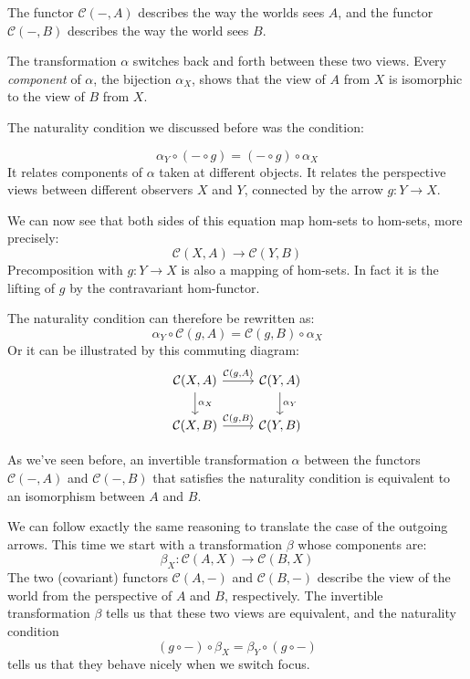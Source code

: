 \documentclass[DaoFP]{subfiles}
\begin{document}
The functor $\mathcal{C}(-, A)$ describes the way the worlds sees $A$, and the functor $\mathcal{C}(-, B)$ describes the way the world sees $B$. 

The transformation $\alpha$ switches back and forth between these two views. Every \emph{component} of $\alpha$, the bijection $\alpha_X$, shows that the view of $A$ from $X$ is isomorphic to the view of $B$ from $X$. 

The naturality condition we discussed before was the condition:

\[ \alpha_Y \circ (- \circ g) = (- \circ g) \circ \alpha_X \]
It relates components of $\alpha$ taken at different objects. It relates the perspective views between different observers $X$ and $Y$, connected by the arrow $g \colon Y \to X$. 

We can now see that both sides of this equation map hom-sets to hom-sets, more precisely:
\[\mathcal{C}(X, A) \to \mathcal{C}(Y, B)\]
Precomposition with $g \colon Y \to X$ is also a mapping of hom-sets. In fact it is the lifting of $g$ by the contravariant hom-functor. 

The naturality condition can therefore be rewritten as:
\[ \alpha_Y \circ \mathcal{C}(g, A) = \mathcal{C}(g, B) \circ \alpha_X \]
Or it can be illustrated by this commuting diagram:
\[
 \begin{tikzcd}
 \mathcal{C}(X, A)
 \arrow[d, "\alpha_X"]
 \arrow[r, "{\mathcal{C}(g, A)}"]
 &
 \mathcal{C}(Y, A)
  \arrow[d, "\alpha_Y"]
 \\
 \mathcal{C}(X, B)
 \arrow[r, "{\mathcal{C}(g, B)}"]
& \mathcal{C}(Y, B)
 \end{tikzcd}
\]

As we've seen before, an invertible transformation $\alpha$ between the functors $\mathcal{C}(-, A)$ and $\mathcal{C}(-, B)$ that satisfies the naturality condition is equivalent to an isomorphism between $A$ and $B$.

We can follow exactly the same reasoning to translate the case of the outgoing arrows. This time we start with a transformation $\beta$ whose components are:
\[ \beta_X \colon \mathcal{C}(A, X) \to \mathcal{C}(B, X) \]
The two (covariant) functors $\mathcal{C}(A, -)$ and $\mathcal{C}(B, -)$ describe the view of the world from the perspective of $A$ and $B$, respectively. The invertible transformation $\beta$ tells us that these two views are equivalent, and the naturality condition 
\[ (g \circ -) \circ \beta_X = \beta_Y \circ (g \circ -) \]
tells us that they behave nicely when we switch focus.
\end{document}
